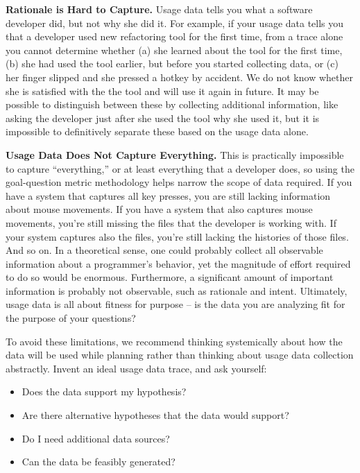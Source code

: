 \documentclass[authoryear]{elsarticle}
\begin{document}
\textbf{Rationale is Hard to Capture.}
Usage data tells you what a software developer did, but not
why she did it.
For example, if your usage data tells you that a developer used
new refactoring tool for the first time, from a trace alone you cannot determine whether
(a) she learned about the tool for the first time, (b) she had used the tool earlier, but before you started collecting data, or (c) her finger slipped and she pressed a hotkey by accident. We do not know whether she is satisfied with the the tool and will use it again in future.
It may be possible to distinguish between these by collecting additional information,
like asking the developer just after she used the tool why she used it,
but it is impossible to definitively separate these based on the
usage data alone.

\textbf{Usage Data Does Not Capture Everything.}
This is practically impossible to  capture ``everything,'' or at least
everything that a developer does, so using the
goal-question metric methodology helps narrow the scope of data required.
If you have a system that captures all key presses, you are still
lacking information about mouse movements.
If you have a system that also captures mouse movements, you're still
missing the files that the developer is working with.
If your system captures also the files, you're still lacking the
histories of those files.
And so on.
In a theoretical sense, one could probably collect all observable information
about a programmer's behavior, yet the magnitude of effort required to 
do so would be enormous.
Furthermore, a significant amount of important information is probably not observable,
such as rationale and intent.
Ultimately, usage data is all about fitness for purpose -- is the data
you are analyzing fit for the purpose of your questions?

To avoid these limitations, we recommend thinking systemically about how the data will be used while planning rather than thinking about usage data collection abstractly.
Invent an ideal usage data trace, and ask yourself:

\begin{itemize}[noitemsep]
  \item Does the data support my hypothesis?
  \item Are there alternative hypotheses that the data would support?
  \item Do I need additional data sources?
  \item Can the data be feasibly generated?
\end{itemize}
\end{document}

